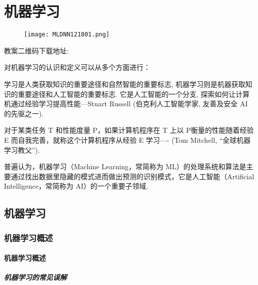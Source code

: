 \chapter{机器学习}\label{AI32PChapter7}
\begin{figure}[H]
\centering
\texttt{[image: MLDNN121801.png]}
\label{MLDNN12019121501}
\end{figure}
教案二维码下载地址: 

对机器学习的认识和定义可以从多个方面进行：
\begin{tcolorbox}[colback=white!50,colframe=orange!50,title=机器学习]
学习是人类获取知识的重要途径和自然智能的重要标志, 机器学习则是机器获取知识的重要途径和人工智能的重要标志.
它是人工智能的一个分支, 探索如何让计算机通过经验学习提高性能---Stuart Russell (伯克利人工智能学家, 友善及安全 AI 的先驱之一).
\end{tcolorbox}
\begin{tcolorbox}[colback=white!50,colframe=orange!50,title=机器学习]
对于某类任务 T 和性能度量 P，如果计算机程序在 T 上以 P衡量的性能随着经验 E 而自我完善，就称这个计算机程序从经验 E 学习---- (Tom Mitchell, “全球机器学习教父”).
\hfill
\end{tcolorbox}
普遍认为，机器学习（Machine Learning，常简称为 ML）的处理系统和算法是主要通过找出数据里隐藏的模式进而做出预测的识别模式，它是人工智能（Artificial Intelligence，常简称为 AI）的一个重要子领域.
\section{机器学习}
\subsection{机器学习概述}
\subsubsection{机器学习概述}
\paragraph{机器学习的常见误解}

